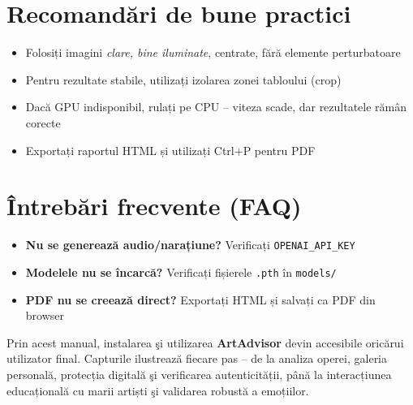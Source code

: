 \section{Recomandări de bune practici}
\begin{itemize}[noitemsep,topsep=2pt]
  \item Folosiți imagini \emph{clare, bine iluminate}, centrate, fără elemente perturbatoare
  \item Pentru rezultate stabile, utilizați izolarea zonei tabloului (crop)
  \item Dacă GPU indisponibil, rulați pe CPU -- viteza scade, dar rezultatele rămân corecte
  \item Exportați raportul HTML și utilizați Ctrl+P pentru PDF
\end{itemize}

\section{Întrebări frecvente (FAQ)}
\begin{itemize}[noitemsep,topsep=2pt]
  \item \textbf{Nu se generează audio/narațiune?} Verificați \texttt{OPENAI\_API\_KEY}
  \item \textbf{Modelele nu se încarcă?} Verificați fișierele \texttt{.pth} în \texttt{models/}
  \item \textbf{PDF nu se creează direct?} Exportați HTML și salvați ca PDF din browser
\end{itemize}

Prin acest manual, instalarea şi utilizarea \textbf{ArtAdvisor} devin accesibile oricărui utilizator final. Capturile ilustrează fiecare pas -- de la analiza operei, galeria personală, protecția digitală şi verificarea autenticității, până la interacțiunea educațională cu marii artiști şi validarea robustă a emoțiilor.